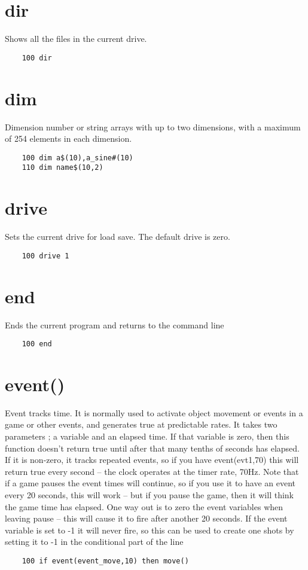 \section*{dir}
Shows all the files in the current drive.
\example{}
\begin{verbatim}
	100 dir
\end{verbatim}

\section*{dim}
Dimension number or string arrays with up to two dimensions, with a maximum of 254 elements in each dimension.
\example{}
\begin{verbatim}
	100 dim a$(10),a_sine#(10)
	110 dim name$(10,2)
\end{verbatim}

\section*{drive}
Sets the current drive for load save. The default drive is zero.
\example{}
\begin{verbatim}
	100 drive 1
\end{verbatim}

\section*{end}
Ends the current program and returns to the command line
\example{}
\begin{verbatim}
	100 end
\end{verbatim}

\section*{event()}
Event tracks time. It is normally used to activate object movement or events in a game or other events, and generates true at predictable rates. It takes two parameters ; a variable and an elapsed time.
If that variable is zero, then this function doesn’t return true until after that many tenths of seconds has elapsed. If it is non-zero, it tracks repeated events, so if you have event(evt1,70) this will return true every second – the clock operates at the timer rate, 70Hz.
Note that if a game pauses the event times will continue, so if you use it to have an event every 20 seconds, this will work – but if you pause the game, then it will think the game time has elapsed. One way out is to zero the event variables when leaving pause – this will cause it to fire after another 20 seconds. 
If the event variable is set to -1 it will never fire, so this can be used to create one shots by setting it to -1 in the conditional part of the line
\example{}
\begin{verbatim}
	100 if event(event_move,10) then move()
\end{verbatim}


